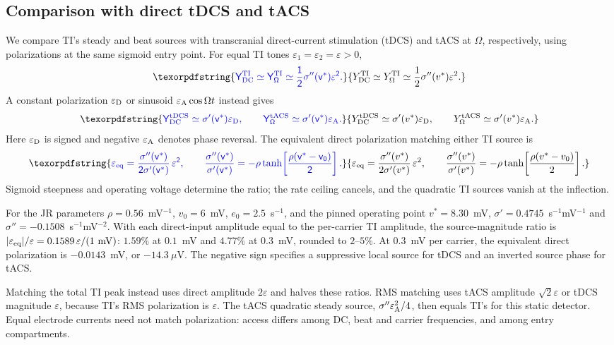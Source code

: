 \documentclass[11pt,a4paper]{article}
\newcommand{\Sig}{\sigma}
\providecommand{\DIFaddtex}[1]{{\protect\color{blue} \sf #1}} %
\providecommand{\DIFaddbegin}{} %
\providecommand{\DIFadd}[1]{\texorpdfstring{\DIFaddtex{#1}}{#1}} %
\begin{document}
\DIFaddbegin \subsection{\DIFadd{Comparison with direct tDCS and tACS}}\label{sec:direct-comparison}
\DIFadd{We compare TI's steady and beat sources with transcranial direct-current
stimulation (tDCS) and tACS at $\Omega$, respectively, using polarizations
at the same sigmoid entry point. For equal TI tones
$\varepsilon_1=\varepsilon_2=\varepsilon>0$,
}\[
\DIFadd{Y_{\rm DC}^{\rm TI}\simeq Y_\Omega^{\rm TI}
\simeq \frac{1}{2}\Sig''(v^*)\varepsilon^2.
}\]
\DIFadd{A constant polarization $\varepsilon_{\rm D}$ or sinusoid
$\varepsilon_{\rm A}\cos\Omega t$ instead gives
}\[
\DIFadd{Y_{\rm DC}^{\rm tDCS}\simeq\Sig'(v^*)\varepsilon_{\rm D},
\qquad
Y_\Omega^{\rm tACS}\simeq\Sig'(v^*)\varepsilon_{\rm A}.
}\]
\DIFadd{Here $\varepsilon_{\rm D}$ is signed and negative $\varepsilon_{\rm A}$
denotes phase reversal. The equivalent direct polarization matching either
TI source is
}\[
\DIFadd{\varepsilon_{\rm eq}
=\frac{\Sig''(v^*)}{2\Sig'(v^*)}\,\varepsilon^2,
\qquad
\frac{\Sig''(v^*)}{\Sig'(v^*)}
=-\rho\tanh\!\left[\frac{\rho(v^*-v_0)}{2}\right].
}\]
\DIFadd{Sigmoid steepness and operating voltage determine the ratio; the rate ceiling
cancels, and the quadratic TI sources vanish at the inflection.
}

\DIFadd{For the JR parameters $\rho=0.56$~mV$^{-1}$, $v_0=6$~mV,
$e_0=2.5$~s$^{-1}$, and the pinned operating point $v^*=8.30$~mV,
$\Sig'=0.4745$~s$^{-1}$mV$^{-1}$ and
$\Sig''=-0.1508$~s$^{-1}$mV$^{-2}$. With each direct-input amplitude
equal to the per-carrier TI amplitude, the source-magnitude ratio is
$|\varepsilon_{\rm eq}|/\varepsilon
=0.1589\,\varepsilon/(1~\mathrm{mV})$:
$1.59\%$ at $0.1$~mV and $4.77\%$ at $0.3$~mV, rounded to $2$--$5\%$.
At $0.3$~mV per carrier, the equivalent direct polarization is
$-0.0143$~mV, or $-14.3~\mu$V. The negative sign specifies a suppressive
local source for tDCS and an inverted source phase for tACS.
}

\DIFadd{Matching the total TI peak instead uses direct amplitude $2\varepsilon$
and halves these ratios. RMS matching uses tACS amplitude
$\sqrt2\varepsilon$ or tDCS magnitude $\varepsilon$, because TI's RMS
polarization is $\varepsilon$. The tACS quadratic steady source,
$\Sig''\varepsilon_{\rm A}^2/4$, then equals TI's for this static detector.
Equal electrode currents need not match polarization: access differs among
DC, beat and carrier frequencies, and among entry compartments.
}
\end{document}
